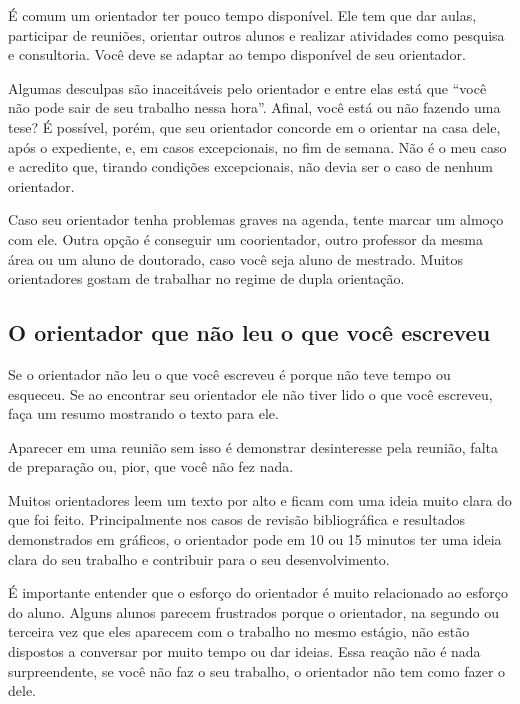 É comum um orientador ter pouco tempo disponível. Ele tem que dar aulas, participar de reuniões, orientar outros alunos e realizar atividades como pesquisa e consultoria. Você deve se adaptar ao tempo disponível de seu orientador. 


Algumas desculpas são inaceitáveis pelo orientador e entre elas está que “você não pode sair de seu trabalho nessa hora”. Afinal, você está ou não fazendo uma tese? É possível, porém, que seu orientador concorde em o orientar na casa dele, após o expediente, e, em casos excepcionais, no fim de semana. Não é o meu caso e acredito que, tirando condições excepcionais, não devia ser o caso de nenhum orientador.


Caso seu orientador tenha problemas graves na agenda, tente marcar um almoço com ele. Outra opção é conseguir um coorientador, outro professor da mesma área ou um aluno de doutorado, caso você seja aluno de mestrado. Muitos orientadores gostam de trabalhar no regime de dupla orientação.


\subsection{	O orientador que não leu o que você escreveu}


Se o orientador não leu o que você escreveu é porque não teve tempo ou esqueceu. Se ao encontrar seu orientador ele não tiver lido o que você escreveu, faça um resumo mostrando o texto para ele. 




Aparecer em uma reunião sem isso é demonstrar desinteresse pela reunião, falta de preparação ou, pior, que você não fez nada.


Muitos orientadores leem um texto por alto e ficam com uma ideia muito clara do que foi feito. Principalmente nos casos de revisão bibliográfica e resultados demonstrados em gráficos, o orientador pode em 10 ou 15 minutos ter uma ideia clara do seu trabalho e contribuir para o seu desenvolvimento. 


É importante entender que o esforço do orientador é muito relacionado ao esforço do aluno. Alguns alunos parecem frustrados porque o orientador, na segundo ou terceira vez que eles aparecem com o trabalho no mesmo estágio, não estão dispostos a conversar por muito tempo ou dar ideias. Essa reação não é nada surpreendente, se você não faz o seu trabalho, o orientador não tem como fazer o dele.


